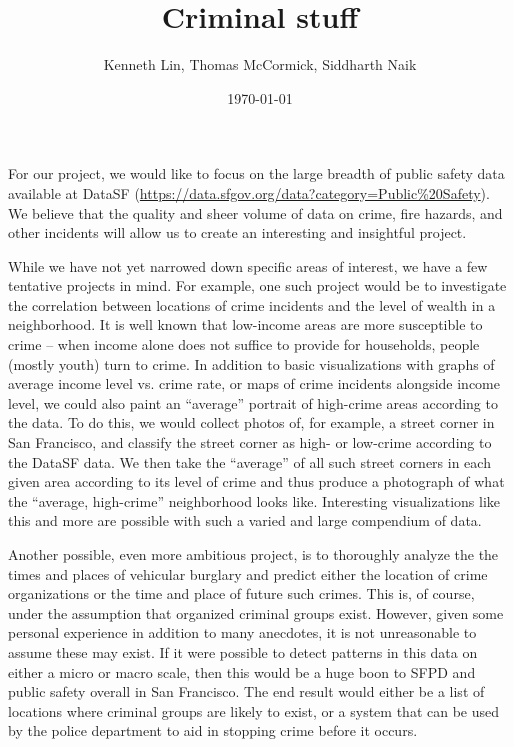 \documentclass{article}
\title{Criminal stuff}
\author{Kenneth Lin, Thomas McCormick, Siddharth Naik}
\date{\today}
\begin{document}
\maketitle

For our project, we would like to focus on the large breadth of public
safety data available at DataSF
(\url{https://data.sfgov.org/data?category=Public\%20Safety}). We believe
that the quality and sheer volume of data on crime, fire hazards, and other
incidents will allow us to create an interesting and insightful project.

While we have not yet narrowed down specific areas of interest, we have a
few tentative projects in mind. For example, one such project would be to
investigate the correlation between locations of crime incidents and the
level of wealth in a neighborhood. It is well known that low-income areas
are more susceptible to crime -- when income alone does not suffice to
provide for households, people (mostly youth) turn to crime. In addition to
basic visualizations with graphs of average income level vs. crime rate, or
maps of crime incidents alongside income level, we could also paint an
``average'' portrait of high-crime areas according to the data. To do this,
we would collect photos of, for example, a street corner in San Francisco,
and classify the street corner as high- or low-crime according to the
DataSF data. We then take the ``average'' of all such street corners in
each given area according to its level of crime and thus produce a
photograph of what the ``average, high-crime'' neighborhood looks
like. Interesting visualizations like this and more are possible with such
a varied and large compendium of data.

Another possible, even more ambitious project, is to thoroughly analyze the
the times and places of vehicular burglary and predict either the location
of crime organizations or the time and place of future such crimes. This
is, of course, under the assumption that organized criminal groups
exist. However, given some personal experience in addition to many
anecdotes, it is not unreasonable to assume these may exist. If it were
possible to detect patterns in this data on either a micro or macro scale,
then this would be a huge boon to SFPD and public safety overall in San
Francisco. The end result would either be a list of locations where
criminal groups are likely to exist, or a system that can be used by the
police department to aid in stopping crime before it occurs.
\end{document}
